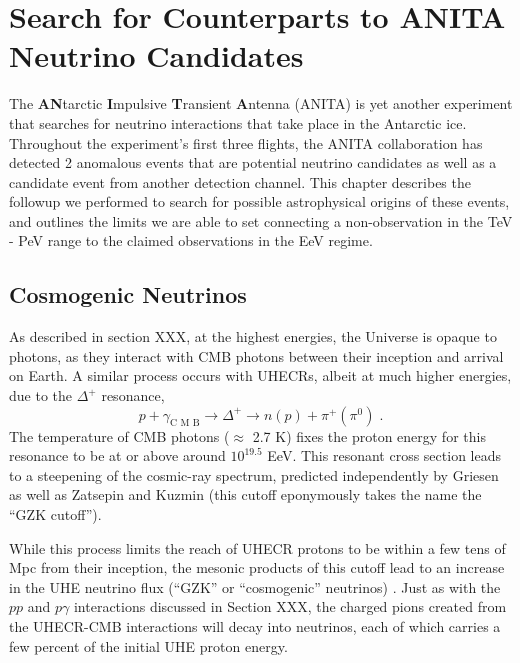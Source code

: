 \chapter{Search for Counterparts to ANITA Neutrino Candidates}
\label{sec:ANITA}


The \textbf{AN}tarctic \textbf{I}mpulsive \textbf{T}ransient \textbf{A}ntenna (ANITA) is yet another experiment that searches for neutrino interactions that take place in the Antarctic ice. Throughout the experiment's first three flights, the ANITA collaboration has detected 2 anomalous events that are potential neutrino candidates as well as a candidate event from another detection channel. This chapter describes the followup we performed to search for possible astrophysical origins of these events, and outlines the limits we are able to set connecting a non-observation in the TeV - PeV range to the claimed observations in the EeV regime.


\section{Cosmogenic Neutrinos}
\label{sec:ANITA:cosmogenic}
As described in section XXX, at the highest energies, the Universe is opaque to photons, as they interact with CMB photons between their inception and arrival on Earth. A similar process occurs with UHECRs, albeit at much higher energies, due to the $\Delta^{+}$ resonance, 
\begin{equation}
    \label{eq:delta_cmb}
    p+\gamma_{\text{C M B}} \rightarrow \Delta^{+} \rightarrow n(p)+\pi^{+}\left(\pi^{0}\right) \; .
\end{equation}
The temperature of CMB photons ($\approx$ 2.7 K) fixes the proton energy for this resonance to be at or above around $10^{19.5}$ EeV. This resonant cross section leads to a steepening of the cosmic-ray spectrum, predicted independently by Griesen \cite{Greisen:1966jv} as well as Zatsepin and Kuzmin \cite{Zatsepin:1966jv} (this cutoff eponymously takes the name the ``GZK cutoff''). 

While this process limits the reach of UHECR protons to be within a few tens of Mpc from their inception, the mesonic products of this cutoff lead to an increase in the UHE neutrino flux (``GZK'' or ``cosmogenic'' neutrinos) \cite{Beresinsky:1969qj}. Just as with the $pp$ and $p\gamma$ interactions discussed in Section XXX, the charged pions created from the UHECR-CMB interactions will decay into neutrinos, each of which carries a few percent of the initial UHE proton energy. 

